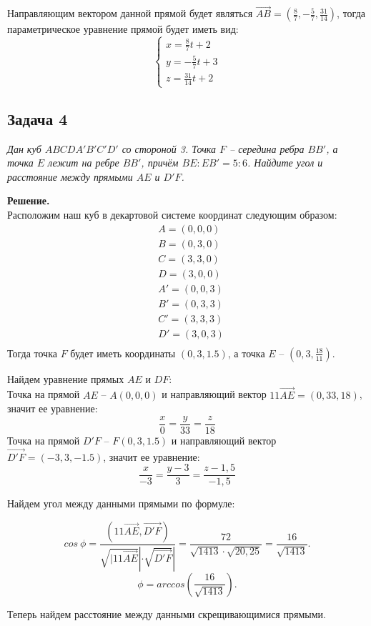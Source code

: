 	Направляющим вектором данной прямой будет являться $\overrightarrow{AB} = (\frac{8}{7}, -\frac{5}{7}, \frac{31}{14})$, тогда параметрическое уравнение прямой будет иметь вид: 
	\[
		\begin{cases}
			x = \frac{8}{7}t + 2 \\
			y = -\frac{5}{7}t + 3 \\
			z = \frac{31}{14}t + 2
		\end{cases}
	\]
	
	
	\subsection{Задача 4} 
	\textit{Дан куб $ABCDA'B'C'D'$ со стороной 3. Точка $F$ -- середина ребра $BB'$, а точка $E$ лежит на ребре $BB'$, причём $BE : EB' = 5 : 6$. Найдите угол и расстояние между прямыми $AE$ и $D'F$.}
	
	\textbf{Решение.}\\
	Расположим наш куб в декартовой системе координат следующим образом:
	\begin{align*}
		&A = (0,0,0) \\
		&B = (0,3,0) \\
		&C = (3,3,0) \\
		&D = (3,0,0) \\
		&A' = (0,0,3) \\
		&B' = (0,3,3) \\
		&C' = (3,3,3) \\
		&D' = (3,0,3) \\
	\end{align*}
	Тогда точка $F$ будет иметь координаты $(0, 3, 1.5)$, а точка $E$ -- $(0, 3, \frac{18}{11})$.
	
	Найдем уравнение прямых $AE$ и $DF$:\\
	Точка на прямой $AE$ -- $A(0,0,0)$ и направляющий вектор $11\overrightarrow{AE} = (0,33,18)$, значит ее уравнение: 
	\[
		\frac{x}{0} = \frac{y}{33} = \frac{z}{18}
	\]
	Точка на прямой $D'F$ -- $F(0, 3, 1.5)$ и направляющий вектор $\overrightarrow{D'F} = (-3,3,-1.5)$, значит ее уравнение: 
	\[
		\frac{x}{-3} = \frac{y - 3}{3} = \frac{z - 1,5}{-1,5}
	\]
	
	Найдем угол между данными прямыми по формуле: 
	
	\[
		cos\ \phi = \frac{(11\overrightarrow{AE}, \overrightarrow{D'F})}{\sqrt{|11\overrightarrow{AE}}| \cdot \sqrt{\overrightarrow{D'F}}|} = \frac{72}{\sqrt{1413}\cdot \sqrt{20,25}} = \frac{16}{\sqrt{1413}}.
	\]
	\[
		\phi = arccos\left(\frac{16}{\sqrt{1413}}\right).
	\]
	
	Теперь найдем расстояние между данными скрещивающимися прямыми. 

	